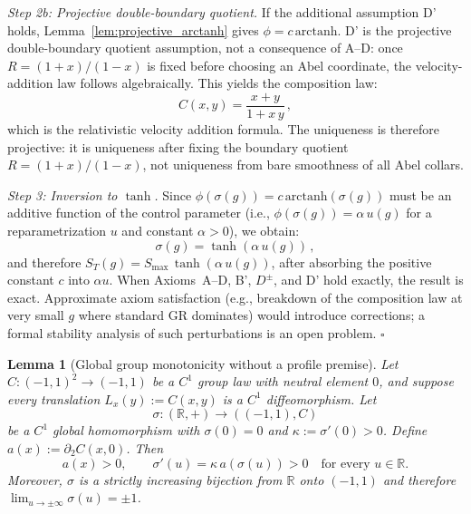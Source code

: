 \documentclass[aps,prd,twocolumn,superscriptaddress,nofootinbib]{revtex4-2}
\newtheorem{lemma}{Lemma}
\begin{document}
\textit{Step 2b: Projective double-boundary quotient.}
If the additional assumption D' holds, Lemma~\ref{lem:projective_arctanh} gives $\phi=c\,\mathrm{arctanh}$. D' is the projective double-boundary quotient assumption, not a consequence of A--D: once $R=(1+x)/(1-x)$ is fixed before choosing an Abel coordinate, the velocity-addition law follows algebraically. This yields the composition law:
\begin{equation}
C(x, y) = \frac{x + y}{1 + x\,y}\,,
\label{eq:addition_formula}
\end{equation}
which is the relativistic velocity addition formula. The uniqueness is therefore projective: it is uniqueness after fixing the boundary quotient $R=(1+x)/(1-x)$, not uniqueness from bare smoothness of all Abel collars.

\textit{Step 3: Inversion to $\tanh$.}
Since $\phi(\sigma(g)) = c\,\mathrm{arctanh}(\sigma(g))$ must be an additive function of the control parameter (i.e., $\phi(\sigma(g)) = \alpha\,u(g)$ for a reparametrization $u$ and constant $\alpha > 0$), we obtain:
\begin{equation}
\sigma(g) = \tanh(\alpha\,u(g))\,,
\end{equation}
and therefore $S_T(g) = S_{\max}\,\tanh(\alpha\,u(g))$, after absorbing the positive constant $c$ into $\alpha u$. When Axioms~A--D, B', $D^\pm$, and D' hold exactly, the result is exact. Approximate axiom satisfaction (e.g., breakdown of the composition law at very small $g$ where standard GR dominates) would introduce corrections; a formal stability analysis of such perturbations is an open problem. \hfill $\square$

\begin{lemma}[Global group monotonicity without a profile premise]
\label{lem:global_monotonicity}
Let $C:(-1,1)^2\to(-1,1)$ be a $C^1$ group law with neutral element $0$, and suppose every translation $L_x(y):=C(x,y)$ is a $C^1$ diffeomorphism. Let
\[
  \sigma:(\mathbb{R},+)\longrightarrow((-1,1),C)
\]
be a $C^1$ global homomorphism with $\sigma(0)=0$ and $\kappa:=\sigma'(0)>0$. Define $a(x):=\partial_2C(x,0)$. Then
\begin{equation}
  a(x)>0,
  \qquad
  \sigma'(u)=\kappa\,a(\sigma(u))>0
  \quad\text{for every }u\in\mathbb{R}.
  \label{eq:global_monotonicity_generator}
\end{equation}
Moreover, $\sigma$ is a strictly increasing bijection from $\mathbb{R}$ onto $(-1,1)$ and therefore $\lim_{u\to\pm\infty}\sigma(u)=\pm1$.
\end{lemma}
\end{document}
